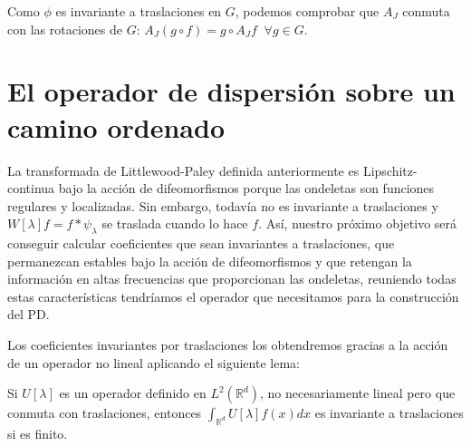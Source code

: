\medskip

\noindent Como $\phi$ es invariante a traslaciones en $G$, podemos comprobar que $A_J$ conmuta con las rotaciones de $G$: $A_J(g\circ f)=g\circ A_J f \;\; \forall g \in G$. 

\section{El operador de dispersión sobre un camino ordenado}

\noindent La transformada de Littlewood-Paley definida anteriormente es Lipschitz-continua bajo la acción de difeomorfismos porque las ondeletas son funciones regulares y localizadas. Sin embargo, todavía no es invariante a traslaciones y $W[\lambda]f=f\ast\psi_\lambda$ se traslada cuando lo hace $f$. Así, nuestro próximo objetivo será conseguir calcular coeficientes que sean invariantes a traslaciones, que permanezcan estables bajo la acción de difeomorfismos y que retengan la información en altas frecuencias que proporcionan las ondeletas, reuniendo todas estas características tendríamos el operador que necesitamos para la construcción del PD. 

\medskip 

\noindent Los coeficientes invariantes por traslaciones los obtendremos gracias a la acción de un operador no lineal aplicando el siguiente lema: 

\begin{lema} \label{lema:Invarianza_traslaciones_integral}
  Si $U[\lambda]$ es un operador definido en $L^2(\mathbb{R}^d)$, no necesariamente lineal pero que conmuta con traslaciones, entonces $\int_{\mathbb{R}^d} U[\lambda]f(x)dx$ es invariante a traslaciones si es finito.
\end{lema}

